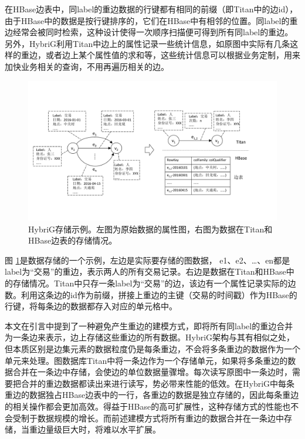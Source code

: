 在HBase边表中，同label的重边数据的行键都有相同的前缀（即Titan中的边id），由于HBase中的数据是按行键排序的，它们在HBase中有相邻的位置。同label的重边经常会被同时检索，这种设计使得一次顺序扫描便可得到所有同label的重边。另外，HybriG利用Titan中边上的属性记录一些统计信息，如原图中实际有几条这样的重边，或者边上某个属性值的求和等，这些统计信息可以根据业务定制，用来加快业务相关的查询，不用再遍历相关的边。

\begin{figure}[htbp]
\centering
\includegraphics[width=150mm]{fig/storage_layer.pdf}
\caption[HybriG存储示例]{HybriG存储示例。左图为原始数据的属性图，右图为数据在Titan和HBase边表的存储情况。}
\label{fig:storage_layer}
\end{figure}

图 \ref{fig:storage_layer}是数据存储的一个示例，左边是实际要存储的图数据， e1、e2、…、en都是label为“交易”的重边，表示两人的所有交易记录。右边是数据在Titan和HBase中的存储情况。Titan中只存一条label为“交易”的边，该边有一个属性记录实际的边数。利用这条边的id作为前缀，拼接上重边的主键（交易的时间戳）作为HBase的行键，将每条边的数据都存入对应的单元格中。

本文在引言中提到了一种避免产生重边的建模方式，即将所有同label的重边合并为一条边来表示，边上存储这些重边的所有数据。HybriG架构与其有相似之处，但本质区别是边集元素的数据粒度仍是每条重边，不会将多条重边的数据作为一个单元来处理。图数据库Titan中将一条边作为一个存储单元，如果将多条重边的数据合并在一条边中存储，会使边的单位数据量骤增。每次读写原图中一条边时，需要把合并的重边数据都读出来进行读写，势必带来性能的低效。在HybriG中每条重边的数据独占HBase边表中的一行，各重边的数据是独立存储的，因此每条重边的相关操作都会更加高效。得益于HBase的高可扩展性，这种存储方式的性能也不会受制于数据规模的增长。而前述建模方式将所有重边的数据合并在一条边中存储，当重边量级巨大时，将难以水平扩展。

